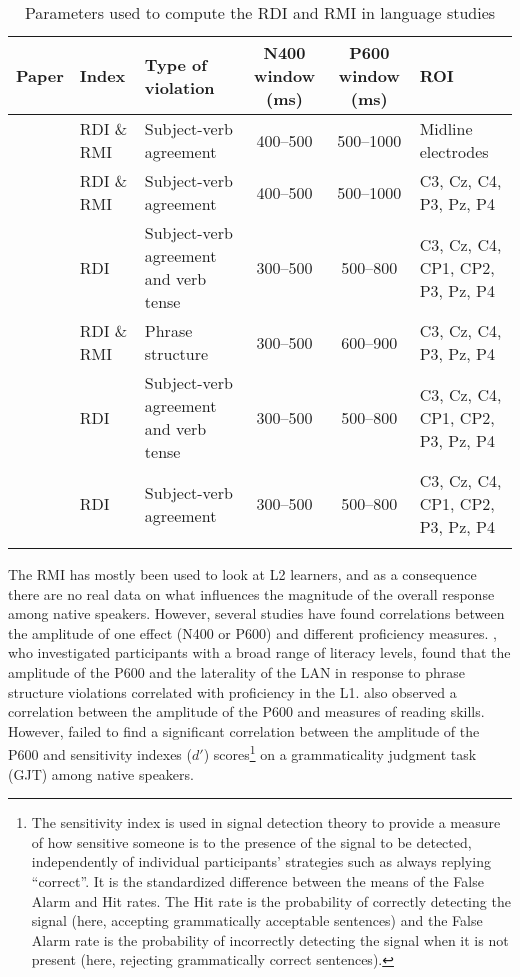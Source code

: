 \documentclass[output=paper,colorlinks,citecolor=brown,modfonts,nonflat]{../langscibook}
\begin{document}
\begin{table}[t]
\caption{Parameters used to compute the RDI and RMI in language studies\label{bkm:Ref4494267}\label{tab:pelissier:1}}
\small
\begin{tabularx}{\textwidth}{QlQCCQ}
\lsptoprule
 Paper & Index & Type of violation & N400 window (ms) & P600 window (ms) & ROI\\
 \midrule
\citet{TannerEtAl2012} & RDI \& RMI & Subject-verb agreement & 400--500 & 500--1000 & Midline electrodes\\
\tablevspace
\citet{TannerEtAl2014} & RDI \& RMI & Subject-verb agreement & 400--500 & 500--1000 & C3, Cz, C4, P3, Pz, P4\\
\tablevspace
\citet{TannerHell2014} & RDI & Subject-verb agreement and verb tense & 300--500 & 500--800 & C3, Cz, C4, CP1, CP2, P3, Pz, P4\\
\tablevspace
\citet{Faretta-StutenbergMorgan-Short2018} & RDI \& RMI & Phrase structure & 300--500 & 600--900 & C3, Cz, C4, P3, Pz, P4\\
\tablevspace
\citet{GreyEtAl2017} & RDI & Subject-verb agreement and verb tense & 300--500 & 500--800 & C3, Cz, C4, CP1, CP2, P3, Pz, P4\\
\tablevspace
\citet{Tanner2019} & RDI & Subject-verb agreement & 300--500 & 500--800 & C3, Cz, C4, CP1, CP2, P3, Pz, P4\\
\lspbottomrule
\end{tabularx}
\end{table}

\largerpage
The RMI has mostly been used to look at L2 learners, and as a consequence there are no real data on what influences the magnitude of the overall response among native speakers. However, several studies have found correlations between the amplitude of one effect (N400 or P600) and different proficiency measures. \citet{PakulakNeville2010}, who investigated participants with a broad range of literacy levels, found that the amplitude of the P600 and the laterality of the LAN in response to phrase structure violations correlated with proficiency in the L1. \citet{MehravariEtAl2017} also observed a correlation between the amplitude of the P600 and measures of reading skills. However, \citet{TannerEtAl2013} failed to find a significant correlation between the amplitude of the P600 and sensitivity indexes ($d′$) scores\footnote{{The sensitivity index is used in signal detection theory to provide a measure of how sensitive someone is to the presence of the signal to be detected, independently of individual participants’ strategies such as always replying “correct”. It is the standardized difference between the means of the False Alarm and Hit rates. The Hit rate is the probability of correctly detecting the signal (here, accepting grammatically acceptable sentences) and the False Alarm rate is the probability of incorrectly detecting the signal when it is not present (here, rejecting grammatically correct sentences).} } on a grammaticality judgment task (GJT) among native speakers.
\newpage
\end{document}
